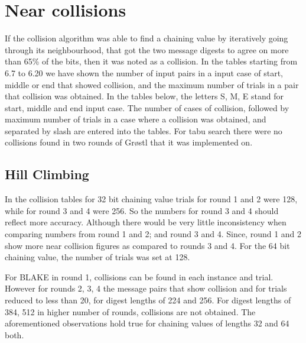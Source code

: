 \section{Near collisions}

If the collision algorithm was able to find a chaining value by iteratively going through its neighbourhood, that got
the two message digests to agree on more than 65\% of the bits, then it was noted as a collision. In the tables
starting from 6.7 to 6.20 we have shown the number of input pairs in a input case of start, middle or end that
showed collision, and the maximum number of trials in a pair that collision was obtained. In the tables below, the
letters S, M, E stand for start, middle and end input case. The number of cases of collision, followed by maximum number
of trials in a case where a collision was obtained, and separated by slash are entered into the tables. For tabu search
there were no collisions found in two rounds of Gr{\o}stl that it was implemented on.

\subsection{Hill Climbing}

In the collision tables for 32 bit chaining value trials for round 1 and 2 were 128, while for round 3 and 4 were 256.
So the numbers for round 3 and 4 should reflect more accuracy. Although there would be very little inconsistency
when comparing numbers from round 1 and 2; and round 3 and 4. Since, round 1 and 2 show more near collision figures
as compared to rounds 3 and 4. For the 64 bit chaining value, the number of trials was set at 128.

For BLAKE in round 1, collisions can be found in each instance and trial. However for rounds 2, 3, 4 the message pairs
that show collision and for trials reduced to less than 20, for digest lengths of 224 and 256. For digest lengths of
384, 512 in higher number of rounds, collisions are not obtained. The aforementioned observations hold true for
chaining values of lengths 32 and 64 both.

